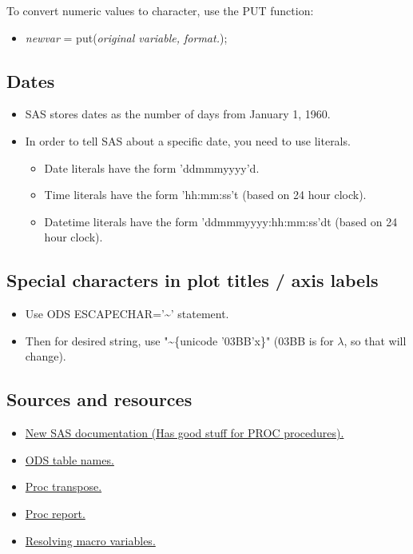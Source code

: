 \documentclass[11pt, oneside]{article}
\begin{document}
To convert numeric values to character, use the PUT function:
\begin{itemize}
\item \textit{newvar} = put(\textit{original variable, format.});
\end{itemize}

\subsection{Dates}

\begin{itemize}
\item SAS stores dates as the number of days from January 1, 1960.
\item In order to tell SAS about a specific date, you need to use literals.
	\begin{itemize}
	\item Date literals have the form 'ddmmmyyyy'd.
	\item Time literals have the form 'hh:mm:ss't (based on 24 hour clock).
	\item Datetime literals have the form 'ddmmmyyyy:hh:mm:ss'dt (based on 24 hour clock).
	\end{itemize}
\end{itemize}

\subsection{Special characters in plot titles / axis labels}

\begin{itemize}
\item Use ODS ESCAPECHAR='\textasciitilde' statement.
\item Then for desired string, use "\textasciitilde\{unicode '03BB'x\}" (03BB is for $ \lambda$, so that will change).
\end{itemize}

\subsection{Sources and resources}

\begin{itemize}
\item \href{https://documentation.sas.com/?cdcId=pgmsascdc\&cdcVersion=9.4\_3.4\&docsetId=pgmsashome\&docsetTarget=home.htm\&locale=en}{\color{blue}New SAS documentation (Has good stuff for PROC procedures).}
\item \href{https://documentation.sas.com/?cdcId=pgmsascdc\&cdcVersion=9.4\_3.4\&docsetId=odsproc\&docsetTarget=p037wkiv6e4hqln1snmfk9b7c9it.htm\&locale=en}{\color{blue}ODS table names.}
\item \href{https://support.sas.com/resources/papers/proceedings09/060-2009.pdf}{\color{blue}Proc transpose.}
\item \href{http://www2.sas.com/proceedings/forum2008/079-2008.pdf}{\color{blue}Proc report.}
\item \href{http://www2.sas.com/proceedings/sugi29/063-29.pdf}{\color{blue}Resolving macro variables.}
\end{itemize}
\end{document}
